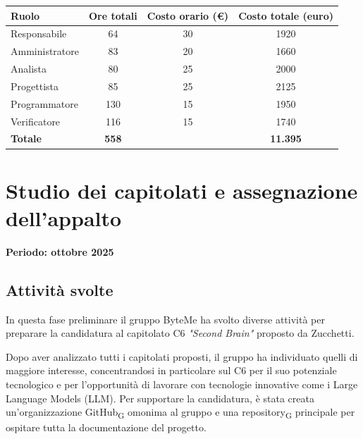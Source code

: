 \documentclass[11pt,a4paper]{article}
\newcommand{\gls}[1]{#1\textsubscript{G}}
\begin{document}
\begin{center}
    \begin{tabular}{|l|c|c|c|}
        \hline
        \textbf{Ruolo} & \textbf{Ore totali} & \textbf{Costo orario (€)} & \textbf{Costo totale (euro)} \\
        \hline
        Responsabile & 64 & 30 & 1920 \\
        \hline
        Amministratore & 83 & 20 & 1660 \\
        \hline
        Analista & 80 & 25 & 2000 \\
        \hline
        Progettista & 85 & 25 & 2125 \\
        \hline
        Programmatore & 130 & 15 & 1950 \\
        \hline
        Verificatore & 116 & 15 & 1740 \\
        \hline
        \textbf{Totale} & \textbf{558} & & \textbf{11.395} \\
        \hline
    \end{tabular}
\end{center}

\newpage

\section{Studio dei capitolati e assegnazione dell'appalto}
\small\textbf{Periodo: ottobre 2025}

\subsection{Attività svolte}
In questa fase preliminare il gruppo ByteMe ha svolto diverse attività per preparare la candidatura al capitolato C6 \textit{"Second Brain"} proposto da Zucchetti.

Dopo aver analizzato tutti i capitolati proposti, il gruppo ha individuato quelli di maggiore interesse, concentrandosi in particolare sul C6 per il suo potenziale tecnologico e per l'opportunità di lavorare con tecnologie innovative come i Large Language Models (LLM). Per supportare la candidatura, è stata creata un'organizzazione \gls{GitHub} omonima al gruppo e una \gls{repository} principale per ospitare tutta la documentazione del progetto.
\end{document}
